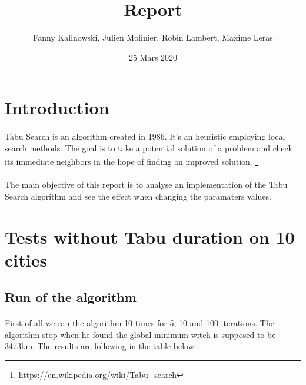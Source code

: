 \documentclass[12pt,oneside,a4paper]{article}
\begin{document}
\title{Report}
\author{Fanny Kalinowski, Julien Molinier, Robin Lambert, Maxime Leras}
\date{25 Mars 2020}
\maketitle
\newpage    
\tableofcontents

\newpage
{}
\section{Introduction}
\paragraph{}
    Tabu Search is an algorithm created in 1986. It's an heuristic employing
    local search methods. The goal is to take a potential solution of a problem
    and check its immediate neighbors in the hope of finding an improved solution.
    \footnote{https://en.wikipedia.org/wiki/Tabu\_search}
\paragraph{}
    The main objective of this report is to analyse an implementation of
    the Tabu Search algorithm and see the effect when changing the paramaters values.




\section{Tests without Tabu duration on 10 cities}
\subsection{Run of the algorithm}
\paragraph{}
    First of all we ran the algorithm 10 times for 5, 10 and 100 iterations. The algorithm stop when he found
    the global minimum witch is supposed to be 3473km. The results are following in the table below :    
\end{document}
